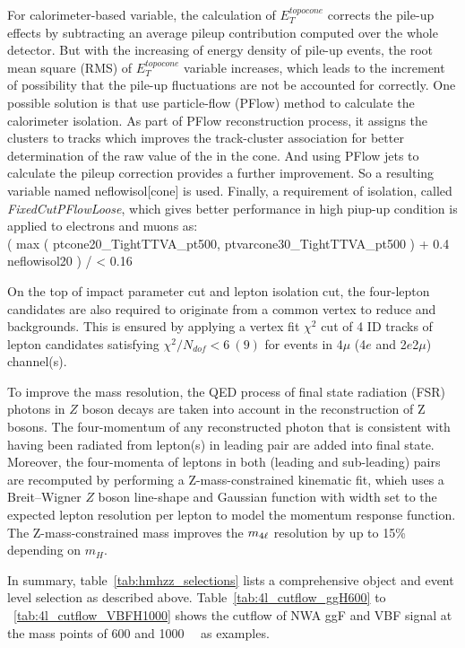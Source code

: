 For calorimeter-based variable, the calculation of $E_{T}^{topocone}$ corrects the pile-up effects by subtracting an average pileup contribution computed over the whole detector.
But with the increasing of energy density of pile-up events, the root mean square (RMS) of $E_{T}^{topocone}$ variable increases,
which leads to the increment of possibility that the pile-up fluctuations are not be accounted for correctly.
One possible solution is that use particle-flow (PFlow) method to calculate the calorimeter isolation.
As part of PFlow reconstruction process, it assigns the clusters to tracks which improves the track-cluster association for better determination of the raw value of the \et in the cone.
And using PFlow jets to calculate the pileup correction provides a further improvement.
So a resulting variable named neflowisol[cone] is used.
Finally, a requirement of isolation, called \textit{FixedCutPFlowLoose}, which gives better performance in high piup-up condition is applied to electrons and muons as: \\
	( max ( ptcone20\_TightTTVA\_pt500, ptvarcone30\_TightTTVA\_pt500 ) + 0.4 \times neflowisol20 ) / \pt < 0.16

On the top of impact parameter cut and lepton isolation cut, the four-lepton candidates are also required to originate from a common vertex to reduce \Zjet and \ttbar backgrounds.
This is ensured by applying a vertex fit $\chi^2$ cut of 4 ID tracks of lepton candidates satisfying $\chi^2 / N_{dof} < 6~(9)$ for events in 4$\mu$ (4$e$ and 2$e$2$\mu$) channel(s).

To improve the mass resolution, the QED process of final state radiation (FSR) photons in $Z$ boson decays are taken into account in the reconstruction of Z bosons.
The four-momentum of any reconstructed photon that is consistent with having been radiated from lepton(s) in leading pair are added into final state.
Moreover, the four-momenta of leptons in both (leading and sub-leading) pairs are recomputed by performing a Z-mass-constrained kinematic fit,
whieh uses a Breit–Wigner $Z$ boson line-shape and Gaussian function with width set to the expected lepton resolution per lepton to model the momentum response function.
The Z-mass-constrained mass improves the $m_{4\ell}$ resolution by up to 15\% depending on $m_{H}$.

In summary, table~\ref{tab:hmhzz_selections} lists a comprehensive object and event level selection as described above.
Table~\ref{tab:4l_cutflow_ggH600} to ~\ref{tab:4l_cutflow_VBFH1000} shows the cutflow of NWA ggF and VBF signal at the mass points of 600 and 1000~\gev~ as examples.

